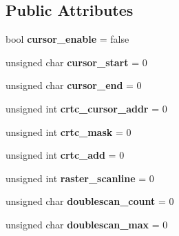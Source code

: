 \subsection*{Public Attributes}
\begin{DoxyCompactItemize}
\item 
\hypertarget{structVGA__Draw__2_a3e2c87bff30885799ed1868f71be87f4}{bool {\bfseries cursor\-\_\-enable} = false}\label{structVGA__Draw__2_a3e2c87bff30885799ed1868f71be87f4}

\item 
\hypertarget{structVGA__Draw__2_a008229132fd76b46b818d2f7c63a14b2}{unsigned char {\bfseries cursor\-\_\-start} = 0}\label{structVGA__Draw__2_a008229132fd76b46b818d2f7c63a14b2}

\item 
\hypertarget{structVGA__Draw__2_a0d7f5ef31e93d671bad46887d3eb5cf8}{unsigned char {\bfseries cursor\-\_\-end} = 0}\label{structVGA__Draw__2_a0d7f5ef31e93d671bad46887d3eb5cf8}

\item 
\hypertarget{structVGA__Draw__2_ad5afc0b5466dade122158793e1ffc4ec}{unsigned int {\bfseries crtc\-\_\-cursor\-\_\-addr} = 0}\label{structVGA__Draw__2_ad5afc0b5466dade122158793e1ffc4ec}

\item 
\hypertarget{structVGA__Draw__2_a3e2542b14747ec53ebd28a9caf76b2b3}{unsigned int {\bfseries crtc\-\_\-mask} = 0}\label{structVGA__Draw__2_a3e2542b14747ec53ebd28a9caf76b2b3}

\item 
\hypertarget{structVGA__Draw__2_a5441c067efdbc052ba541e184fb9e07c}{unsigned int {\bfseries crtc\-\_\-add} = 0}\label{structVGA__Draw__2_a5441c067efdbc052ba541e184fb9e07c}

\item 
\hypertarget{structVGA__Draw__2_a3229636d7d9eb8e1b97d0e2cd2069ba1}{unsigned int {\bfseries raster\-\_\-scanline} = 0}\label{structVGA__Draw__2_a3229636d7d9eb8e1b97d0e2cd2069ba1}

\item 
\hypertarget{structVGA__Draw__2_a4bc02b20a23fce2945b4d27103bb7f13}{unsigned char {\bfseries doublescan\-\_\-count} = 0}\label{structVGA__Draw__2_a4bc02b20a23fce2945b4d27103bb7f13}

\item 
\hypertarget{structVGA__Draw__2_a6cbd228e9408e82f35bf0d7e0afe56f6}{unsigned char {\bfseries doublescan\-\_\-max} = 0}\label{structVGA__Draw__2_a6cbd228e9408e82f35bf0d7e0afe56f6}


\end{DoxyCompactItemize}
